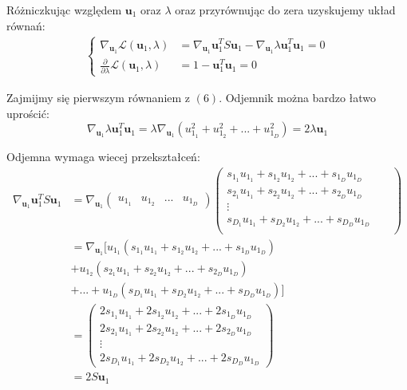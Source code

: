 \documentclass{article}
\newcommand{\bb}{\textbf}
\begin{document}
Różniczkując względem $\bb{u}_1$ oraz $\lambda$ oraz przyrównując do zera uzyskujemy układ równań:
\begin{align}
\begin{cases}
	\nabla_{\bb{u}_1} \mathcal{L} (\bb{u}_1, \lambda) &= \nabla_{\bb{u}_1} \bb{u}_1^T S \bb{u}_1 - \nabla_{\bb{u}_1} \lambda \bb{u}_1^T \bb{u}_1 = 0 \\
	\frac{\partial}{\partial \lambda} \mathcal{L} (\bb{u}_1, \lambda) &= 1 - \bb{u}_1^T \bb{u}_1 = 0
\end{cases}
\end{align}

Zajmijmy się pierwszym równaniem z $(6)$. Odjemnik można bardzo łatwo uprościć:
\begin{equation}
	\nabla_{\bb{u}_1} \lambda \bb{u}_1^T \bb{u}_1 = \lambda \nabla_{\bb{u}_1} 
		(u_{1_1}^2 + u_{1_2}^2 + ... + u_{1_D}^2)
	 	= 2 \lambda \bb{u}_1
\end{equation}

Odjemna wymaga wiecej przekształceń:
\begin{align}
	\nabla_{\bb{u}_1} \bb{u}_1^T S \bb{u}_1 
	&= \nabla_{\bb{u}_1} 
	\left( \begin{array}{llll} u_{1_1} & u_{1_2} & ... & u_{1_D} \end{array} \right)
	\begin{pmatrix}
         s_{1_1} u_{1_1} + s_{1_2} u_{1_2} + ... + s_{1_D} u_{1_D}  \\
		 s_{2_1} u_{1_1} + s_{2_2} u_{1_2} + ... + s_{2_D} u_{1_D} && \\
		 \vdots     \\
		 s_{D_1} u_{1_1} + s_{D_2} u_{1_2} + ... + s_{D_D} u_{1_D} && \\
    \end{pmatrix} \\
    &= \nabla_{\bb{u}_1} [u_{1_1} (s_{1_1} u_{1_1} + s_{1_2} u_{1_2} + ... + s_{1_D} u_{1_D})  \\
    				&+ u_{1_2} (s_{2_1} u_{1_1} + s_{2_2} u_{1_2} + ... + s_{2_D} u_{1_D}) \nonumber \\
    				&+ ... + u_{1_D} (s_{D_1} u_{1_1} + s_{D_2} u_{1_2} + ... + s_{D_D} u_{1_D})] \nonumber \\
    &= \begin{pmatrix}
    	2 s_{1_1} u_{1_1} + 2 s_{1_2} u_{1_2} + ... + 2 s_{1_D} u_{1_D}  \\
    	2 s_{2_1} u_{1_1} + 2 s_{2_2} u_{1_2} + ... + 2 s_{2_D} u_{1_D}  \\
    	\vdots     \\
	    2 s_{D_1} u_{1_1} + 2 s_{D_2} u_{1_2} + ... + 2 s_{D_D} u_{1_D}
    \end{pmatrix} \\
    &= 2 S \bb{u}_1
\end{align}
\end{document}
